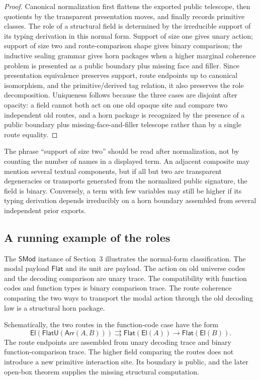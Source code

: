 \begin{proof}
Canonical normalization first flattens the exported public telescope, then quotients by the
transparent presentation moves, and finally records primitive classes.  The role of a
structural field is determined by the irreducible support of its typing derivation in this
normal form.  Support of size one gives unary action; support of size two and route-comparison
shape gives binary comparison; the inductive sealing grammar gives horn packages when a
higher marginal coherence problem is presented as a public boundary plus missing face and
filler.  Since presentation equivalence preserves support, route endpoints up to canonical
isomorphism, and the primitive/derived tag relation, it also preserves the role decomposition.
Uniqueness follows because the three cases are disjoint after opacity: a field cannot both
act on one old opaque site and compare two independent old routes, and a horn package is
recognized by the presence of a public boundary plus missing-face-and-filler telescope rather
than by a single route equality.
\end{proof}

\begin{remark}
The phrase ``support of size two'' should be read after normalization, not by counting the
number of names in a displayed term.  An adjacent composite may mention several textual
components, but if all but two are transparent degeneracies or transports generated from the
normalized public signature, the field is binary.  Conversely, a term with few variables may
still be higher if its typing derivation depends irreducibly on a horn boundary assembled from
several independent prior exports.
\end{remark}

\subsection{A running example of the roles}

The \(\mathsf{SMod}\) instance of Section~3 illustrates the normal-form classification.  The
modal payload \(\mathsf{Flat}\) and its unit are payload.  The action on old universe codes
and the decoding comparison are unary trace.  The compatibility with function codes and
function types is binary comparison trace.  The route coherence comparing the two ways to
transport the modal action through the old decoding law is a structural horn package.

Schematically, the two routes in the function-code case have the form
\[
  \mathsf{El}(\mathsf{FlatU}(\mathsf{Arr}(A,B)))
  \rightrightarrows
  \mathsf{Flat}(\mathsf{El}(A)) \to \mathsf{Flat}(\mathsf{El}(B)).
\]
The route endpoints are assembled from unary decoding trace and binary function-comparison
trace.  The higher field comparing the routes does not introduce a new primitive interaction
site.  Its boundary is public, and the later open-box theorem supplies the missing
structural computation.

